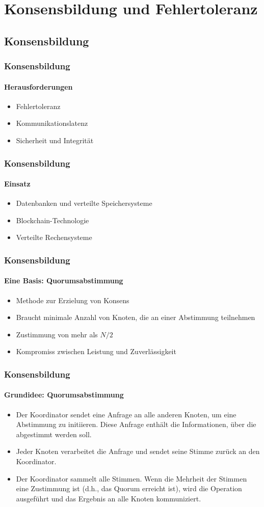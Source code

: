 \section{Konsensbildung und Fehlertoleranz}
\subsection{Konsensbildung}
\begin{frame}
  \frametitle{Konsensbildung}
  \framesubtitle{Herausforderungen}
  \begin{itemize}
    \item Fehlertoleranz
    \item Kommunikationslatenz
    \item Sicherheit und Integrität
  \end{itemize}
\end{frame}

\begin{frame}
  \frametitle{Konsensbildung}
  \framesubtitle{Einsatz}
  \begin{itemize}
    \item Datenbanken und verteilte Speichersysteme
    \item Blockchain-Technologie
    \item Verteilte Rechensysteme
  \end{itemize}
\end{frame}

\begin{frame}
  \frametitle{Konsensbildung}
  \framesubtitle{Eine Basis: Quorumsabstimmung}
  \begin{itemize}
    \item Methode zur Erzielung von Konsens
    \item Braucht minimale Anzahl von Knoten, die an einer Abstimmung teilnehmen
    \item Zustimmung von mehr als $N/2$
    \item Kompromiss zwischen Leistung und Zuverlässigkeit
  \end{itemize}
\end{frame}

\begin{frame}
  \frametitle{Konsensbildung}
  \framesubtitle{Grundidee: Quorumsabstimmung}
 \begin{itemize}
  \item Der Koordinator sendet eine Anfrage an alle anderen Knoten, um eine Abstimmung zu initiieren. Diese Anfrage enthält die Informationen, über die abgestimmt werden soll.
  \item Jeder Knoten verarbeitet die Anfrage und sendet seine Stimme zurück an den Koordinator.
  \item Der Koordinator sammelt alle Stimmen. Wenn die Mehrheit der Stimmen eine Zustimmung ist (d.h., das Quorum erreicht ist), wird die Operation ausgeführt und das Ergebnis an alle Knoten kommuniziert.
  \end{itemize}
\end{frame}

